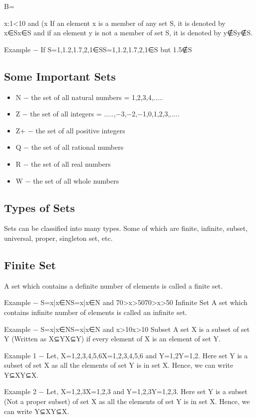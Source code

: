 \documentclass[12pt]{article}
\begin{document}
B={x:1\leqx<10 and (x%
If an element x is a member of any set S, it is denoted by x∈Sx∈S and if an element y is not a member of set S, it is denoted by y∉Sy∉S.

Example − If S={1,1.2,1.7,2},1∈SS={1,1.2,1.7,2},1∈S but 1.5∉S
\subsection{Some Important Sets}
\begin{itemize}
\item N − the set of all natural numbers = {1,2,3,4,.....}
\item Z − the set of all integers = {.....,−3,−2,−1,0,1,2,3,.....}
\item Z+ − the set of all positive integers
\item Q − the set of all rational numbers
\item R − the set of all real numbers
\item W − the set of all whole numbers
\end{itemize}

\subsection{Types of Sets}
Sets can be classified into many types. Some of which are finite, infinite, subset, universal, proper, singleton set, etc.

\subsection{Finite Set}
A set which contains a definite number of elements is called a finite set.

Example − S={x|x∈NS={x|x∈N and 70>x>50}70>x>50}
Infinite Set
A set which contains infinite number of elements is called an infinite set.

Example − S={x|x∈NS={x|x∈N and x>10}x>10}
Subset
A set X is a subset of set Y (Written as X⊆YX⊆Y) if every element of X is an element of set Y.

Example 1 − Let, X={1,2,3,4,5,6}X={1,2,3,4,5,6} and Y={1,2}Y={1,2}. Here set Y is a subset of set X as all the elements of set Y is in set X. Hence, we can write Y⊆XY⊆X.

Example 2 − Let, X={1,2,3}X={1,2,3} and Y={1,2,3}Y={1,2,3}. Here set Y is a subset (Not a proper subset) of set X as all the elements of set Y is in set X. Hence, we can write Y⊆XY⊆X.

}
\end{document}
